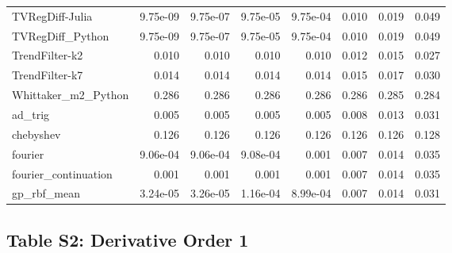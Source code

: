 \begin{longtable}{lrrrrrrr}
TVRegDiff-Julia & 9.75e-09 & 9.75e-07 & 9.75e-05 & 9.75e-04 & 0.010 & 0.019 & 0.049 \\
TVRegDiff\_Python & 9.75e-09 & 9.75e-07 & 9.75e-05 & 9.75e-04 & 0.010 & 0.019 & 0.049 \\
TrendFilter-k2 & 0.010 & 0.010 & 0.010 & 0.010 & 0.012 & 0.015 & 0.027 \\
TrendFilter-k7 & 0.014 & 0.014 & 0.014 & 0.014 & 0.015 & 0.017 & 0.030 \\
Whittaker\_m2\_Python & 0.286 & 0.286 & 0.286 & 0.286 & 0.286 & 0.285 & 0.284 \\
ad\_trig & 0.005 & 0.005 & 0.005 & 0.005 & 0.008 & 0.013 & 0.031 \\
chebyshev & 0.126 & 0.126 & 0.126 & 0.126 & 0.126 & 0.126 & 0.128 \\
fourier & 9.06e-04 & 9.06e-04 & 9.08e-04 & 0.001 & 0.007 & 0.014 & 0.035 \\
fourier\_continuation & 0.001 & 0.001 & 0.001 & 0.001 & 0.007 & 0.014 & 0.035 \\
gp\_rbf\_mean & 3.24e-05 & 3.26e-05 & 1.16e-04 & 8.99e-04 & 0.007 & 0.014 & 0.031 \\
\bottomrule
\end{longtable}

\clearpage

\subsection*{Table S2: Derivative Order 1}

